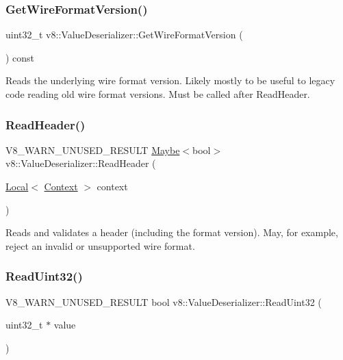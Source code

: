 \subsubsection{\texorpdfstring{Get\+Wire\+Format\+Version()}{GetWireFormatVersion()}}
{\footnotesize\ttfamily uint32\+\_\+t v8\+::\+Value\+Deserializer\+::\+Get\+Wire\+Format\+Version (\begin{DoxyParamCaption}{ }\end{DoxyParamCaption}) const}

Reads the underlying wire format version. Likely mostly to be useful to legacy code reading old wire format versions. Must be called after Read\+Header. \mbox{\label{classv8_1_1ValueDeserializer_a5b6c24dcdd0fa8b241cf45d058f1270c}} 
\subsubsection{\texorpdfstring{Read\+Header()}{ReadHeader()}}
{\footnotesize\ttfamily V8\+\_\+\+W\+A\+R\+N\+\_\+\+U\+N\+U\+S\+E\+D\+\_\+\+R\+E\+S\+U\+LT \mbox{\hyperlink{classv8_1_1Maybe}{Maybe}}$<$bool$>$ v8\+::\+Value\+Deserializer\+::\+Read\+Header (\begin{DoxyParamCaption}\item[{\mbox{\hyperlink{classv8_1_1Local}{Local}}$<$ \mbox{\hyperlink{classv8_1_1Context}{Context}} $>$}]{context }\end{DoxyParamCaption})}

Reads and validates a header (including the format version). May, for example, reject an invalid or unsupported wire format. \mbox{\label{classv8_1_1ValueDeserializer_a77133b51f7cbad0bdd5faf1f32457abb}} 
\subsubsection{\texorpdfstring{Read\+Uint32()}{ReadUint32()}}
{\footnotesize\ttfamily V8\+\_\+\+W\+A\+R\+N\+\_\+\+U\+N\+U\+S\+E\+D\+\_\+\+R\+E\+S\+U\+LT bool v8\+::\+Value\+Deserializer\+::\+Read\+Uint32 (\begin{DoxyParamCaption}\item[{uint32\+\_\+t $\ast$}]{value }\end{DoxyParamCaption})}


